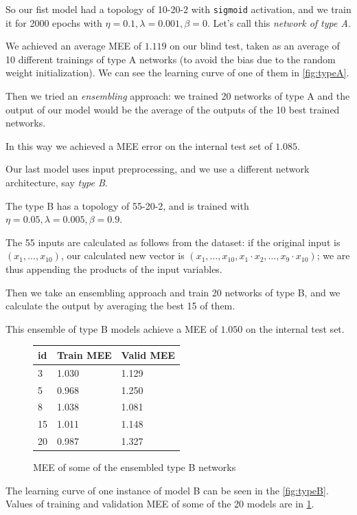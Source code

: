 So our fist model had a topology of 10-20-2 with \texttt{sigmoid} activation, and we train it for 2000 epochs with $\eta=0.1,\lambda=0.001,\beta=0$. Let's call this \emph{network of type A}.

We achieved an average MEE of $1.119$ on our blind test, taken as an average of 10 different trainings of type A networks (to avoid the bias due to the random weight initialization). We can see the learning curve of one of them in \cref{fig:typeA}.

Then we tried an \emph{ensembling} approach: we trained 20 networks of type A and the output of our model would be the average of the outputs of the 10 best trained networks.

In this way we achieved a MEE error on the internal test set of $1.085$.

\bigskip
Our last model uses input preprocessing, and we use a different network architecture, say \emph{type B}.

The type B has a topology of 55-20-2, and is trained with $\eta=0.05,\lambda=0.005,\beta=0.9$.

The 55 inputs are calculated as follows from the dataset: if the original input is $(x_1,\dots,x_{10})$, our calculated new vector is $(x_1,\dots,x_{10},x_1\cdot x_2,\dots,x_9\cdot x_{10})$; we are thus appending the products of the input variables.

Then we take an ensembling approach and train 20 networks of type B, and we calculate the output by averaging the best 15 of them.

This ensemble of type B models achieve a MEE of $1.050$ on the internal test set.


\begin{figure}
    \centering
    \begin{tabular}{|l|l|l|}
        \hline
        id & Train MEE & Valid MEE \\ \hline
        3 & 1.030 & 1.129 \\ \hline
        5 & 0.968 & 1.250 \\ \hline
        8 & 1.038 & 1.081 \\ \hline
        15 & 1.011 & 1.148 \\ \hline
        20 & 0.987 & 1.327 \\ \hline
    \end{tabular}
    \caption{MEE of some of the ensembled type B networks}
    \label{fig:cup55-table}
\end{figure}


The learning curve of one instance of model B can be seen in the \cref{fig:typeB}. Values of training and validation MEE of some of the 20 models are in \cref{fig:cup55-table}.




